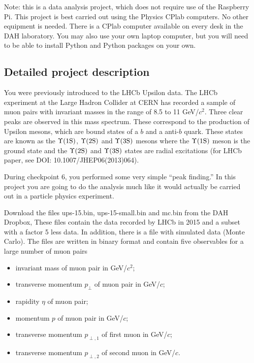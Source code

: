 Note: this is a data analysis project, which does not require use of the Raspberry Pi.
This project is best carried out using the Physics CPlab computers. No other equipment is needed.  There is a CPlab computer available on every desk in the DAH laboratory.
You may also use your own laptop computer, but you will need to be able to install
Python and Python packages on your own. 


\subsection{Detailed project description}
  
You were previously introduced to the LHCb Upsilon data. 
The LHCb experiment at the Large Hadron Collider at CERN has recorded a sample of muon pairs with invariant masses in the range of 8.5 to 11 GeV/$c^2$. Three clear peaks are observed in this mass spectrum. These correspond to the production of Upsilon mesons, which are bound states of a $b$ and a anti-$b$ quark. These states are known as the $\Upsilon \rm (1S)$, $\Upsilon \rm (2S)$ and $\Upsilon \rm (3S)$ mesons where the $\Upsilon \rm (1S)$ meson is the ground state and the $\Upsilon \rm (2S)$  and $\Upsilon \rm (3S)$  states are radial excitations (for LHCb paper, see {DOI: 10.1007/JHEP06(2013)064).}


During checkpoint 6, you performed some very simple ``peak finding.'' In this project you are going to do the analysis much like it would actually be carried out in a particle physics experiment.

Download the files ups-15.bin, ups-15-small.bin and mc.bin   from the DAH Dropbox, 
These files contain the data recorded by LHCb in 2015 and a subset with a factor 5 less data. 
In addition, there is a file with simulated data (Monte Carlo).
The files are written in binary format and contain five observables for a large number of muon pairs
\begin{itemize}
\item  invariant mass of muon pair in   GeV/$c^2$;
\item transverse momentum $p_\perp$ of muon pair in GeV/$c$;
\item rapidity $\eta$ of muon pair;
\item  momentum $p$ of muon pair in GeV/$c$;
\item transverse momentum $p_{\perp,1}$ of first muon in GeV/$c$;
\item transverse momentum $p_{\perp,2}$ of second muon in GeV/$c$.
\end{itemize}

